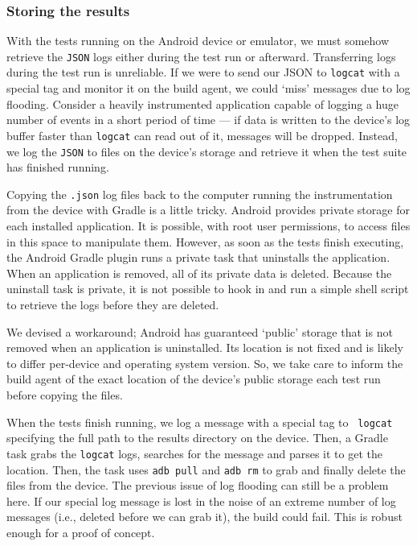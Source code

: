 \subsubsection{Storing the results}

With the tests running on the Android device or emulator, we must somehow
retrieve the {\tt JSON} logs either during the test run or afterward.
Transferring logs during the test run is unreliable. If we were to send our JSON
to {\tt logcat} with a special tag and monitor it on the build agent, we could
{\lq}miss{\rq} messages due to log flooding. Consider a heavily instrumented
application capable of logging a huge number of events in a short period of time
--- if data is written to the device's log buffer faster than {\tt logcat} can
read out of it, messages will be dropped. Instead, we log the {\tt JSON} to
files on the device's storage and retrieve it when the test suite has finished
running.

Copying the {\tt .json} log files back to the computer running the
instrumentation from the device with Gradle is a little tricky. Android provides
private storage for each installed application. It is possible, with root user
permissions, to access files in this space to manipulate them. However, as soon
as the tests finish executing, the Android Gradle plugin runs a private task
that uninstalls the application. When an application is removed, all of its
private data is deleted. Because the uninstall task is private, it is not
possible to hook in and run a simple shell script to retrieve the logs before
they are deleted.

We devised a workaround; Android has guaranteed {\lq}public{\rq} storage that is
not removed when an application is uninstalled. Its location is not fixed and is
likely to differ per-device and operating system version. So, we take care to
inform the build agent of the exact location of the device's public storage each
test run before copying the files.

When the tests finish running, we log a message with a special tag to {\tt
logcat} specifying the full path to the results directory on the device. Then, a
Gradle task grabs the {\tt logcat} logs, searches for the message and parses it
to get the location. Then, the task uses {\tt adb pull} and {\tt adb rm} to grab
and finally delete the files from the device. The previous issue of log flooding
can still be a problem here. If our special log message is lost in the noise of
an extreme number of log messages (i.e., deleted before we can grab it), the
build could fail. This is robust enough for a proof of concept.

